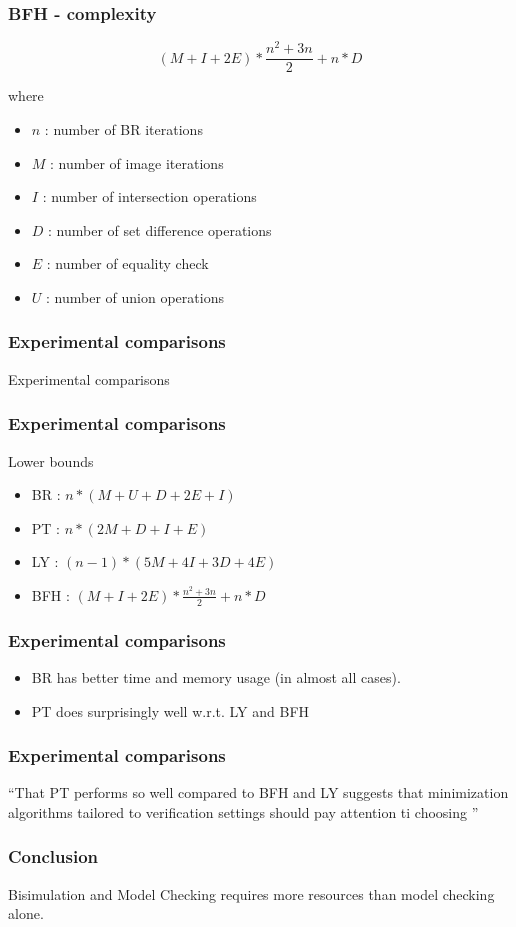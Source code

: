 \documentclass[11pt,handout]{beamer}
\begin{document}
\begin{frame}
  \frametitle{BFH - complexity}
  \[
    (M + I + 2E) * \frac{n^2 + 3n}{2} + n * D
  \]

  where

  \begin{itemize}
  \item $n$ : number of BR iterations
  \item $M$ : number of image iterations
  \item $I$ : number of intersection operations
  \item $D$ : number of set difference operations
  \item $E$ : number of equality check
  \item $U$ : number of union operations
  \end{itemize}
\end{frame}

\begin{frame}
  \frametitle{Experimental comparisons}
  Experimental comparisons
\end{frame}

\begin{frame}
  \frametitle{Experimental comparisons}

  Lower bounds
  
  \begin{itemize}
  \item BR : $n*(M + U + D + 2E + I)$
  \item PT : $n * (2M + D + I + E)$
  \item LY : $(n-1)*(5M + 4I  + 3D + 4E)$
  \item BFH : $(M + I + 2E) * \frac{n^2 + 3n}{2} + n * D$
  \end{itemize}
\end{frame}

\begin{frame}
  \frametitle{Experimental comparisons}
  \begin{itemize}
  \item BR has better time and memory usage (in almost all cases).
  \item PT does surprisingly well w.r.t. LY and BFH
  \end{itemize}
\end{frame}

\begin{frame}
  \frametitle{Experimental comparisons}
  ``That PT performs so well compared to BFH and LY suggests that minimization
  algorithms tailored to verification settings should pay attention ti choosing ''
\end{frame}

\begin{frame}
  \frametitle{Conclusion}
  Bisimulation and Model Checking requires more resources than model checking
  alone.
\end{frame}
\end{document}
